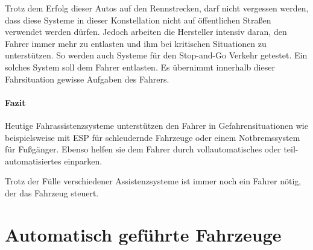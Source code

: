 Trotz dem Erfolg dieser Autos auf den Rennstrecken, darf nicht vergessen werden, dass diese Systeme in dieser Konstellation nicht auf öffentlichen Straßen verwendet werden dürfen. Jedoch arbeiten die Hersteller intensiv daran, den Fahrer immer mehr zu entlasten und ihm bei kritischen Situationen zu unterstützen. So werden auch Systeme für den Stop-and-Go Verkehr getestet. Ein solches System soll dem Fahrer entlasten. Es übernimmt innerhalb dieser Fahrsituation gewisse Aufgaben des Fahrers.

\paragraph{Fazit} Heutige Fahrassistenzsysteme unterstützen den Fahrer in Gefahrensituationen wie beispielsweise mit ESP für schleudernde Fahrzeuge oder einem Notbremssystem für Fußgänger. Ebenso helfen sie dem Fahrer durch vollautomatisches oder teil-automatisiertes einparken. 

Trotz der Fülle verschiedener Assistenzsysteme ist  immer noch ein Fahrer nötig, der das Fahrzeug steuert. 




\section{Automatisch geführte Fahrzeuge}
